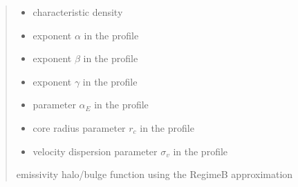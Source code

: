 \documentclass[letterpaper,10pt,english]{sphinxmanual}
\begin{document}
\begin{fulllineitems}
\begin{quote}
\begin{description}
\begin{itemize}
\item {} 
\sphinxAtStartPar
{} \textendash{} characteristic density

\item {} 
\sphinxAtStartPar
{} \textendash{} exponent \(\alpha\) in the {\hyperref[\detokenize{diffsph.profiles:diffsph.profiles.templates.hdz}]{}} profile

\item {} 
\sphinxAtStartPar
{} \textendash{} exponent \(\beta\) in the {\hyperref[\detokenize{diffsph.profiles:diffsph.profiles.templates.hdz}]{}} profile

\item {} 
\sphinxAtStartPar
{} \textendash{} exponent \(\gamma\) in the {\hyperref[\detokenize{diffsph.profiles:diffsph.profiles.templates.hdz}]{}} profile

\item {} 
\sphinxAtStartPar
{} \textendash{} parameter \(\alpha_E\) in the {\hyperref[\detokenize{diffsph.profiles:diffsph.profiles.templates.enst}]{}} profile

\item {} 
\sphinxAtStartPar
{} \textendash{} core radius parameter \(r_c\) in the {\hyperref[\detokenize{diffsph.profiles:diffsph.profiles.templates.cnfw}]{}} profile

\item {} 
\sphinxAtStartPar
{} \textendash{} velocity dispersion parameter \(\sigma_v\) in the {\hyperref[\detokenize{diffsph.profiles:diffsph.profiles.templates.sis}]{}} profile

\end{itemize}

\sphinxAtStartPar
emissivity halo/bulge function using the Regime\sphinxhyphen{}B approximation

\end{description}\end{quote}

\end{fulllineitems}
\end{document}
